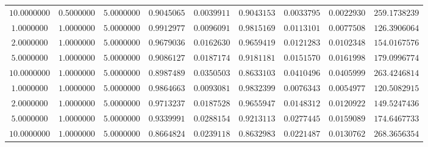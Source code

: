 \begin{tabular}{ccccccccc}
$10.0000000$ & $0.5000000$ & $5.0000000$ & $0.9045065$ & $0.0039911$ & $0.9043153$ & $0.0033795$ & $0.0022930$ & $259.1738239$\\
$1.0000000$ & $1.0000000$ & $5.0000000$ & $0.9912977$ & $0.0096091$ & $0.9815169$ & $0.0113101$ & $0.0077508$ & $126.3906064$\\
$2.0000000$ & $1.0000000$ & $5.0000000$ & $0.9679036$ & $0.0162630$ & $0.9659419$ & $0.0121283$ & $0.0102348$ & $154.0167576$\\
$5.0000000$ & $1.0000000$ & $5.0000000$ & $0.9086127$ & $0.0187174$ & $0.9181181$ & $0.0151570$ & $0.0161998$ & $179.0996774$\\
$10.0000000$ & $1.0000000$ & $5.0000000$ & $0.8987489$ & $0.0350503$ & $0.8633103$ & $0.0410496$ & $0.0405999$ & $263.4246814$\\
$1.0000000$ & $1.0000000$ & $5.0000000$ & $0.9864663$ & $0.0093081$ & $0.9832399$ & $0.0076343$ & $0.0054977$ & $120.5082915$\\
$2.0000000$ & $1.0000000$ & $5.0000000$ & $0.9713237$ & $0.0187528$ & $0.9655947$ & $0.0148312$ & $0.0120922$ & $149.5247436$\\
$5.0000000$ & $1.0000000$ & $5.0000000$ & $0.9339991$ & $0.0288154$ & $0.9213113$ & $0.0277445$ & $0.0159089$ & $174.6467733$\\
$10.0000000$ & $1.0000000$ & $5.0000000$ & $0.8664824$ & $0.0239118$ & $0.8632983$ & $0.0221487$ & $0.0130762$ & $268.3656354$\\
\end{tabular}
